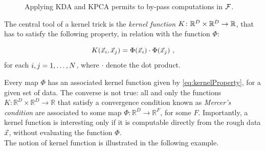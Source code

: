 \begin{figure}
\centering
{
}
\caption{Applying KDA and KPCA permits to by-pass computations in $\mathcal{F}$.}\label{fig:scheme2}
\end{figure}

The central tool of a kernel trick is the \emph{kernel function} $K \colon \mathbb{R}^D \times \mathbb{R}^D \rightarrow \mathbb{R}$, that has to satisfy the following property, in relation with the function $\Phi$:

\begin{equation}\label{eq:kernelProperty}
K(\vec{x}_i,\vec{x}_j) = \Phi(\vec{x}_i)\cdot \Phi(\vec{x}_j) \mbox{ ,}
\end{equation}
for each $i,j= 1,\dots, N$, where $\cdot$ denote the dot product.


Every map $\Phi$ has an associated kernel function given by \eqref{eq:kernelProperty}, for a given set of data. The converse is not true: all and only the functions $K\colon\mathbb{R}^D\times \mathbb{R}^D \rightarrow \mathbb{R}$ that satisfy a convergence condition known as {\em Mercer's condition} are associated to some map $\Phi:\mathbb{R}^D	\rightarrow \mathbb{R}^F$, for some $F$. Importantly, a kernel function is interesting only if it is computable directly from the rough data $\vec{x}$, without evaluating the function $\Phi$. \\

The notion of kernel function is illustrated in the following example.

